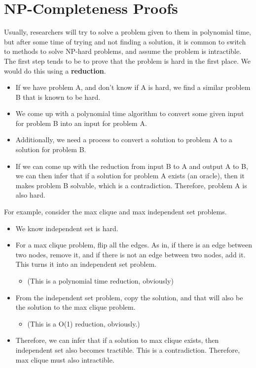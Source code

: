 \documentclass[10pt]{article}
\begin{document}
\section*{NP-Completeness Proofs}
Usually, researchers will try to solve a problem given to them in polynomial time, but after some time of trying and not finding a solution, it is common to switch to methods to solve NP-hard problems, and assume the problem is intractible.  The first step tends to be to prove that the problem is hard in the first place.  We would do this using a \textbf{reduction}.
\begin{itemize}
	\item If we have problem A, and don't know if A is hard, we find a similar problem B that is known to be hard.
	\item We come up with a polynomial time algorithm to convert some given input for problem B into an input for problem A.
	\item Additionally, we need a process to convert a solution to problem A to a solution for problem B.
	\item If we can come up with the reduction from input B to A and output A to B, we can then infer that if a solution for problem A exists (an oracle), then it makes problem B solvable, which is a contradiction.  Therefore, problem A is also hard.
\end{itemize}
For example, consider the max clique and max independent set problems.
\begin{itemize}
	\item We know independent set is hard.
	\item For a max clique problem, flip all the edges.  As in, if there is an edge between two nodes, remove it, and if there is not an edge between two nodes, add it.  This turns it into an independent set problem.
	\begin{itemize}
	    \item (This is a polynomial time reduction, obviously)
    \end{itemize}
    \item From the independent set problem, copy the solution, and that will also be the solution to the max clique problem.
    \begin{itemize}
	    \item (This is a O(1) reduction, obviously.)
    \end{itemize}
    \item Therefore, we can infer that if a solution to max clique exists, then independent set also becomes tractible.  This is a contradiction.  Therefore, max clique must also intractible.
\end{itemize}
\end{document}
